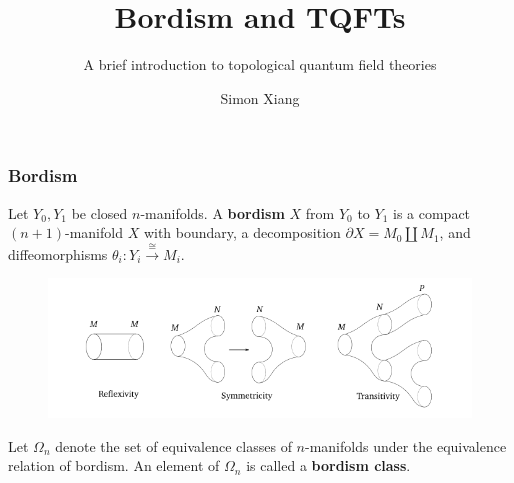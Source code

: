 \documentclass[xcolor=dvipsnames]{beamer}
\title{Bordism and TQFTs}
\subtitle{A brief introduction to topological quantum field theories}
\author{Simon Xiang}
\institute{University of Texas at Austin}
\begin{document}
 
    \begin{frame}
        \titlepage
    \end{frame}

    \begin{frame}
\frametitle{Bordism} 
\begin{definition}[]
    Let $Y_0,Y_1$ be closed $n$-manifolds. A \textbf{bordism} $X$ from $Y_0$ to $Y_1$ is a compact $(n+1)$-manifold $X$ with boundary, a decomposition $\partial X= M_0 \amalg M_1$, and diffeomorphisms $\theta _i  \colon Y_i  \xrightarrow{\cong}  M_i $. 
\end{definition}
\begin{figure}[H]
\centering
 \includegraphics[width=0.6\linewidth]{figures/equivbord.png}
\end{figure}
\begin{definition}[]
    Let $\Omega_n $ denote the set of equivalence classes of $n$-manifolds under the equivalence relation of bordism. An element of $\Omega_n $ is called a \textbf{bordism class}.
\end{definition}
    \end{frame}
\end{document}
